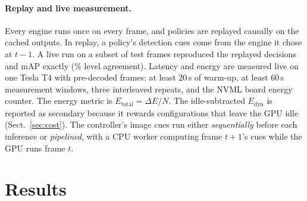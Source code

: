 \documentclass{svproc}
\begin{document}
\paragraph{Replay and live measurement.} Every engine runs once on every frame, and policies are replayed causally on the cached outputs.
In replay, a policy's detection cues come from the engine it chose at $t{-}1$. A live run on a subset of \LiveFrames{} test frames reproduced the replayed
decisions and mAP exactly (\LiveAgreementPct\% level agreement). Latency and energy are measured live on one Tesla T4 with
pre-decoded frames: at least 20\,s of warm-up, at least 60\,s measurement windows, three interleaved repeats, and the NVML board energy counter.
The energy metric is $E_\text{total}=\Delta E/N$. The idle-subtracted $E_\text{dyn}$ is reported as secondary because it
rewards configurations that leave the GPU idle (Sect.~\ref{sec:cost}). The controller's image cues run either
\emph{sequentially} before each inference or \emph{pipelined}, with a CPU worker computing frame $t{+}1$'s cues while the GPU runs frame $t$.

\section{Results}\label{sec:results}
\end{document}
